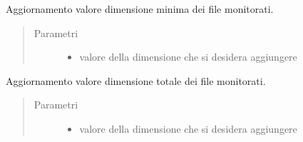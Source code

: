 \documentclass[letterpaper,10pt,italian,openany,oneside]{sphinxmanual}
\begin{document}
\begin{fulllineitems}
\label{\detokenize{code/scan:c.updateDimMin}}
Aggiornamento valore dimensione minima dei file monitorati.
\begin{quote}\begin{description}
\item[{Parametri}] \leavevmode\begin{itemize}
\item {} 
 \textendash{} valore della dimensione che si desidera aggiungere

\end{itemize}

\end{description}\end{quote}

\end{fulllineitems}


\begin{fulllineitems}
\label{\detokenize{code/scan:c.increaseDimTotale}}
Aggiornamento valore dimensione totale dei file monitorati.
\begin{quote}\begin{description}
\item[{Parametri}] \leavevmode\begin{itemize}
\item {} 
 \textendash{} valore della dimensione che si desidera aggiungere

\end{itemize}

\end{description}\end{quote}

\end{fulllineitems}

\end{document}
